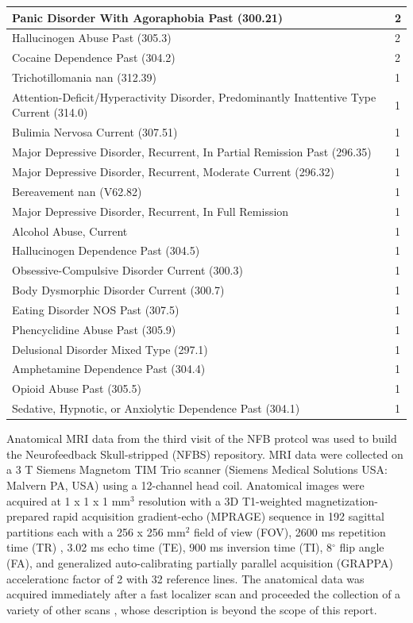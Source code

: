 \documentclass{bmcart}
\begin{document}
\begin{table}[h!]
\begin{tabular}{ p{6.0cm}|p{0.8cm} }
        Panic Disorder With Agoraphobia Past (300.21) & 2  \\ \hline
        Hallucinogen Abuse Past (305.3) & 2  \\ \hline
        Cocaine Dependence Past (304.2) & 2  \\ \hline
        Trichotillomania nan (312.39) & 1  \\ \hline
        Attention-Deficit/Hyperactivity Disorder, Predominantly Inattentive Type Current (314.0) & 1  \\ \hline
        Bulimia Nervosa Current (307.51) & 1  \\ \hline
        Major Depressive Disorder, Recurrent, In Partial Remission Past (296.35) & 1  \\ \hline
        Major Depressive Disorder, Recurrent, Moderate Current (296.32) & 1  \\ \hline
        Bereavement nan (V62.82) & 1  \\ \hline
        Major Depressive Disorder, Recurrent, In Full Remission & 1  \\ \hline
        Alcohol Abuse, Current & 1  \\ \hline
        Hallucinogen Dependence Past (304.5) & 1  \\ \hline
        Obsessive-Compulsive Disorder Current (300.3) & 1  \\ \hline
        Body Dysmorphic Disorder Current (300.7) & 1  \\ \hline
        Eating Disorder NOS Past (307.5) & 1  \\ \hline
        Phencyclidine Abuse Past (305.9) & 1  \\ \hline
        Delusional Disorder Mixed Type (297.1) & 1  \\ \hline
        Amphetamine Dependence Past (304.4) & 1  \\ \hline
        Opioid Abuse Past (305.5) & 1  \\ \hline
        Sedative, Hypnotic, or Anxiolytic Dependence Past (304.1) & 1 \\ \hline
      \end{tabular}
      \label{psych}
\end{table}


Anatomical MRI data from the third visit of the NFB protcol was used to build the Neurofeedback Skull-stripped (NFBS) repository. MRI data were collected on a 3 T Siemens Magnetom TIM Trio scanner (Siemens Medical Solutions USA: Malvern PA, USA) using a 12-channel head coil. Anatomical images were acquired at 1 x 1 x 1 mm$^3$ resolution with a 3D T1-weighted magnetization-prepared rapid acquisition gradient-echo (MPRAGE) \cite{Mugler1990} sequence in 192 sagittal partitions each with a 256 x 256 mm$^2$ field of view (FOV), 2600 ms repetition time (TR) , 3.02 ms echo time (TE), 900 ms inversion time (TI), 8$^{\circ}$ flip angle (FA), and generalized auto-calibrating partially parallel acquisition (GRAPPA) accelerationc\cite{Griswold2002} factor of 2 with 32 reference lines. The anatomical data was acquired immediately after a fast localizer scan and proceeded the collection of a variety of other scans \cite{nki_mrproto}, whose description is beyond the scope of this report.
\end{document}

